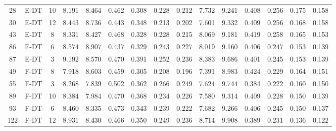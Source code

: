 \begin{table}
\begin{tabular}{@{\hskip3pt}c@{\hskip3pt}c@{\hskip3pt}c@{\hskip3pt}c@{\hskip3pt}c@{\hskip3pt}c@{\hskip3pt}c@{\hskip3pt}c@{\hskip3pt}c@{\hskip3pt}c@{\hskip3pt}c@{\hskip3pt}c@{\hskip3pt}c@{\hskip3pt}c@{\hskip3pt}c}
         28 &           E-DT &                  10 &             8.191 &       8.464 &         0.462 &       0.308 &       0.228 &        0.212 &               7.732 &       9.241 &         0.408 &       0.256 &       0.175 &        0.158 \\
         30 &           E-DT &                  12 &             8.443 &       8.736 &         0.443 &       0.348 &       0.213 &        0.202 &               7.601 &       9.332 &         0.409 &       0.256 &       0.168 &        0.158 \\
         43 &           E-DT &                   8 &             8.331 &       8.427 &         0.468 &       0.328 &       0.228 &        0.215 &               8.069 &       9.181 &         0.419 &       0.258 &       0.165 &        0.153 \\
         86 &           E-DT &                   6 &             8.574 &       8.907 &         0.437 &       0.329 &       0.243 &        0.227 &               8.019 &       9.160 &         0.406 &       0.247 &       0.153 &        0.139 \\
         87 &           E-DT &                   3 &             9.192 &       8.570 &         0.470 &       0.391 &       0.252 &        0.236 &               8.383 &       9.686 &         0.401 &       0.245 &       0.153 &        0.139 \\
         49 &           F-DT &                   8 &             7.918 &       8.603 &         0.459 &       0.305 &       0.208 &        0.196 &               7.391 &       8.983 &         0.424 &       0.229 &       0.164 &        0.151 \\
         55 &           F-DT &                   3 &             8.268 &       7.839 &         0.502 &       0.362 &       0.266 &        0.249 &               7.624 &       9.744 &         0.384 &       0.222 &       0.160 &        0.150 \\
         89 &           F-DT &                  10 &             8.384 &       7.984 &         0.470 &       0.368 &       0.234 &        0.226 &               7.580 &       9.314 &         0.409 &       0.228 &       0.150 &        0.139 \\
         93 &           F-DT &                   6 &             8.460 &       8.335 &         0.473 &       0.343 &       0.239 &        0.222 &               7.682 &       9.266 &         0.406 &       0.245 &       0.150 &        0.137 \\
        122 &           F-DT &                  12 &             8.931 &       8.430 &         0.466 &       0.350 &       0.249 &        0.236 &               8.714 &       9.908 &         0.389 &       0.231 &       0.136 &        0.122 \\
\bottomrule
\end{tabular}
\end{table}

